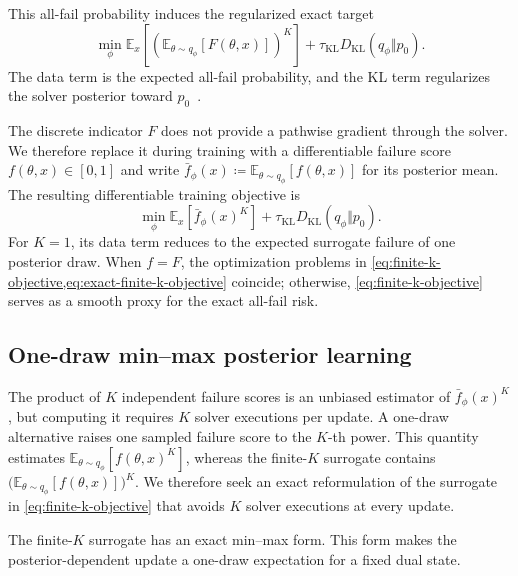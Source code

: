 This all-fail probability induces the regularized exact target
\begin{equation}
  \min_\phi
  \mathbb E_x
  \left[
    \left(
      \mathbb E_{\theta\sim q_\phi}[F(\theta,x)]
    \right)^K
  \right]
  +
  \tau_{\mathrm{KL}}D_{\mathrm{KL}}(q_\phi\Vert p_0).
  \label{eq:exact-finite-k-objective}
\end{equation}
The data term is the expected all-fail probability, and the KL term regularizes the solver posterior toward $p_0$~\citep{bissiri2016general,lacostejulien2011losscalibrated}.

The discrete indicator $F$ does not provide a pathwise gradient through the solver.
We therefore replace it during training with a differentiable failure score $f(\theta,x)\in[0,1]$ and write $\bar f_\phi(x)\coloneqq\mathbb E_{\theta\sim q_\phi}[f(\theta,x)]$ for its posterior mean.
The resulting differentiable training objective is
\begin{equation}
  \min_\phi
  \mathbb E_x[\bar f_\phi(x)^K]
  +
  \tau_{\mathrm{KL}}D_{\mathrm{KL}}(q_\phi\Vert p_0).
  \label{eq:finite-k-objective}
\end{equation}
For $K=1$, its data term reduces to the expected surrogate failure of one posterior draw.
When $f=F$, the optimization problems in \cref{eq:finite-k-objective,eq:exact-finite-k-objective} coincide; otherwise, \cref{eq:finite-k-objective} serves as a smooth proxy for the exact all-fail risk.

\subsection{One-draw min--max posterior learning}
\label{sec:fenchel}

The product of $K$ independent failure scores is an unbiased estimator of $\bar f_\phi(x)^K$, but computing it requires $K$ solver executions per update.
A one-draw alternative raises one sampled failure score to the $K$-th power.
This quantity estimates $\mathbb E_{\theta\sim q_\phi}[f(\theta,x)^K]$, whereas the finite-$K$ surrogate contains $\bigl(\mathbb E_{\theta\sim q_\phi}[f(\theta,x)]\bigr)^K$.
We therefore seek an exact reformulation of the surrogate in \cref{eq:finite-k-objective} that avoids $K$ solver executions at every update.

The finite-$K$ surrogate has an exact min--max form.
This form makes the posterior-dependent update a one-draw expectation for a fixed dual state.

